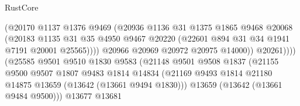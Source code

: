 \begin{lexlean}{RustCore}
\begin{coremodule}
                                            (@20170
                                              @1137
                                              @1376
                                              @9469
                                              (@20936
                                                @1136
                                                @31
                                                @1375
                                                @1865
                                                @9468
                                                @20068
                                                (@20183
                                                  @1135
                                                  @31
                                                  @35
                                                  @4950
                                                  @9467
                                                  @20220
                                                  (@22601 @894 @31 @34 @1941 @7191 @20001 @25565))))
                                            @20966
                                            @20969
                                            @20972
                                            @20975
                                            @14000))
                                        @20261))))
                                (@25585
                                  @9501
                                  @9510
                                  @1830
                                  @9583
                                  (@21148
                                    @9501
                                    @9508
                                    @1837
                                    (@21155
                                      @9500
                                      @9507
                                      @1807
                                      @9483
                                      @1814
                                      @14834
                                      (@21169
                                        @9493
                                        @1814
                                        @21180
                                        @14875
                                        @13659
                                        (@13642 (@13661 @9494 @1830)))
                                      @13659
                                      (@13642 (@13661 @9484 @9500)))
                                    @13677
                                    @13681

\end{coremodule}
\end{lexlean}
